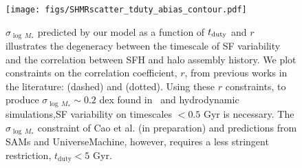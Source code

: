 \documentclass[12pt, letterpaper, preprint, tighten]{aastex62}
\newcommand{\logsfr}{\log\mathrm{SFR}}
\begin{document}
%

\begin{figure}
\begin{center}
\texttt{[image: figs/SHMRscatter\_tduty\_abias\_contour.pdf]}
    \caption{$\sigma_{\log\,M_*}$ predicted by our model as a function of 
    $t_{\rm duty}$ and $r$ illustrates the degeneracy between the timescale of 
    SF variability and the correlation between SFH and halo assembly history. 
    We plot constraints on the correlation coefficient, $r$, from previous
    works in the literature: \cite{tinker2018b} (dashed) and \cite{behroozi2018} 
    (dotted). Using these $r$ constraints, to produce $\sigma_{\log\,M_*} \sim 0.2$ dex
    found in~\cite{more2011, leauthaud2012, reddick2013, tinker2013, zu2015} and 
    hydrodynamic simulations,SF variability on timescales $< 0.5$ Gyr is necessary.
    The $\sigma_{\log\,M_*}$ constraint of Cao et al. (in preparation) and predictions 
    from SAMs and {\sc UniverseMachine}, however, requires a less stringent 
    restriction, $t_\mathrm{duty} < 5$ Gyr. 
    }
\label{fig:r_tduty}
\end{center}
\end{figure}
\end{document}
